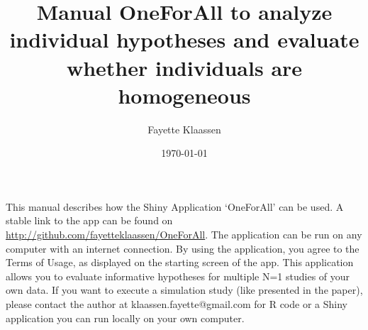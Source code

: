 \documentclass[11pt, fullpage, a4paper]{article}
\title{Manual OneForAll to analyze individual hypotheses and evaluate whether individuals are homogeneous}
\author{Fayette Klaassen}
\date{\today}
\begin{document}
	
	\maketitle	

This manual describes how the Shiny Application `OneForAll' can be used.
A stable link to the app can be found on \href{http://github.com/fayetteklaassen/OneForAll}{http://github.com/fayetteklaassen/OneForAll}.
The application can be run on any computer with an internet connection.
By using the application, you agree to the Terms of Usage, as displayed on the starting screen of the app.
This application allows you to evaluate informative hypotheses for multiple N=1 studies of your own data.
If you want to execute a simulation study (like presented in the paper), please contact the author at klaassen.fayette@gmail.com for R code or a Shiny application you can run locally on your own computer.
	
\end{document}
